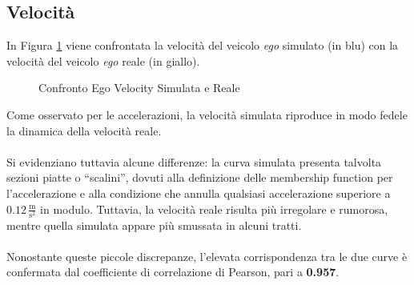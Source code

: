 \subsection{Velocità}
\noindent In Figura \ref{fig:ego_velocity_reale} viene confrontata la velocità del veicolo \emph{ego} simulato (in blu) 
con la velocità del veicolo \emph{ego} reale (in giallo). 
\begin{figure}[H]
    \centering
    \caption{Confronto Ego Velocity Simulata e Reale}
    \label{fig:ego_velocity_reale}
\end{figure}
\noindent Come osservato per le accelerazioni, la velocità simulata riproduce in modo fedele la dinamica della velocità reale.  
\\\\
\noindent Si evidenziano tuttavia alcune differenze: la curva simulata presenta talvolta sezioni piatte o “scalini”, 
dovuti alla definizione delle membership function per l'accelerazione e alla condizione che annulla qualsiasi 
accelerazione superiore a $0.12 \,\frac{\mathrm{m}}{\mathrm{s^2}}$ in modulo.
Tuttavia, la velocità reale risulta più irregolare e rumorosa, mentre quella simulata appare più smussata in alcuni tratti.  
\\\\
\noindent Nonostante queste piccole discrepanze, l'elevata corrispondenza tra le due curve è confermata dal coefficiente di 
correlazione di Pearson, pari a \textbf{0.957}.
